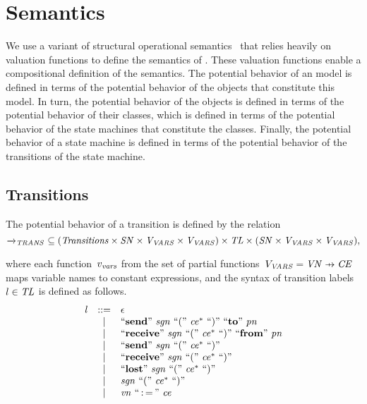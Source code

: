 \section{Semantics}
We use a variant of structural operational semantics~\cite{SOS2004Plotkin, HennessySemantics90} that relies heavily on valuation functions to define the semantics of \SLCO.
These valuation functions enable a compositional definition of the semantics.
The potential behavior of an \SLCO model is defined in terms of the potential behavior of the objects that constitute this model.
In turn, the potential behavior of the objects is defined in terms of the potential behavior of their classes, which is defined in terms of the potential behavior of the state machines that constitute the classes.
Finally, the potential behavior of a state machine is defined in terms of the potential behavior of the transitions of the state machine.

\subsection{Transitions}
The potential behavior of a transition is defined by the relation
%
\[
\xrightarrow{\it{}}_{\it{TRANS}} ~ \subseteq (\it Transitions \times \it SN \times V_{\it{VARS}} \times V_{\it{VARS}}) \times \it TL \times (\it SN \times V_{\it{VARS}} \times V_{\it{VARS}}),
\]

\noindent
where each function~$v_{\it{vars}}$ from the set of partial functions~$\VVARS = \VariableNames \pfun \ConstantExpressions$ maps variable names to constant expressions, and the syntax of transition labels~$l \in \it TL$ is defined as follows.
%
\[
\begin{array}{lcl}
\it{l} & ::= & \epsilon \\
        & |   & ``\textbf{send}"~\it{sgn}~``("~\it{ce^*}~``)"~``\textbf{to}"~\it{pn} \\
        & |   & ``\textbf{receive}"~\it{sgn}~``("~\it{ce^*}~``)"~``\textbf{from}"~\it{pn} \\
        & |   & ``\textbf{send}"~\it{sgn}~``("~\it{ce^*}~``)" \\
        & |   & ``\textbf{receive}"~\it{sgn}~``("~\it{ce^*}~``)" \\
        & |   & ``\textbf{lost}"~\it{sgn}~``("~\it{ce^*}~``)" \\
        & |   & \it{sgn}~``("~\it{ce^*}~``)" \\
        & |   & \it{vn}~``\operatorname*{:=}"~\it{ce} \\
\end{array}
\]

